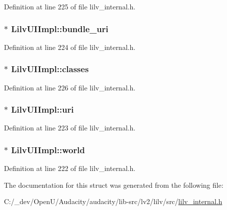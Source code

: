 Definition at line 225 of file lilv\+\_\+internal.\+h.

\subsubsection[{\texorpdfstring{bundle\+\_\+uri}{bundle_uri}}]{$\ast$ Lilv\+U\+I\+Impl\+::bundle\+\_\+uri}\hypertarget{struct_lilv_u_i_impl_afafd4bbee3a55a9f76945a3b12eba3a8}{}\label{struct_lilv_u_i_impl_afafd4bbee3a55a9f76945a3b12eba3a8}


Definition at line 224 of file lilv\+\_\+internal.\+h.

\subsubsection[{\texorpdfstring{classes}{classes}}]{$\ast$ Lilv\+U\+I\+Impl\+::classes}\hypertarget{struct_lilv_u_i_impl_acc59c13176894446e108f82b6bff63ae}{}\label{struct_lilv_u_i_impl_acc59c13176894446e108f82b6bff63ae}


Definition at line 226 of file lilv\+\_\+internal.\+h.

\subsubsection[{\texorpdfstring{uri}{uri}}]{$\ast$ Lilv\+U\+I\+Impl\+::uri}\hypertarget{struct_lilv_u_i_impl_a5935a8137062a5eef57688e6295b6265}{}\label{struct_lilv_u_i_impl_a5935a8137062a5eef57688e6295b6265}


Definition at line 223 of file lilv\+\_\+internal.\+h.

\subsubsection[{\texorpdfstring{world}{world}}]{$\ast$ Lilv\+U\+I\+Impl\+::world}\hypertarget{struct_lilv_u_i_impl_a769fea1595c8a3c7b32182d62c7dffbb}{}\label{struct_lilv_u_i_impl_a769fea1595c8a3c7b32182d62c7dffbb}


Definition at line 222 of file lilv\+\_\+internal.\+h.



The documentation for this struct was generated from the following file\+:\begin{DoxyCompactItemize}
\item 
C\+:/\+\_\+dev/\+Open\+U/\+Audacity/audacity/lib-\/src/lv2/lilv/src/\hyperlink{lilv__internal_8h}{lilv\+\_\+internal.\+h}\end{DoxyCompactItemize}
